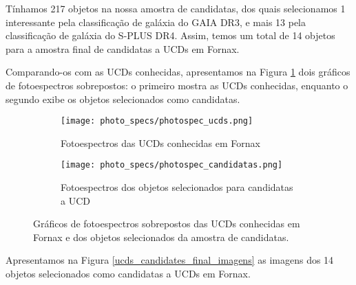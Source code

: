 Tínhamos 217 objetos na nossa amostra de candidatas, dos quais selecionamos 1 interessante pela classificação de galáxia do GAIA DR3, e mais 13 pela classificação de galáxia do S-PLUS DR4. Assim, temos um total de 14 objetos para a amostra final de candidatas a UCDs em Fornax.

Comparando-os com as UCDs conhecidas, apresentamos na Figura \ref{ucds_and_candiadates_star_cut_photospec} dois gráficos de fotoespectros sobrepostos: o primeiro mostra as UCDs conhecidas, enquanto o segundo exibe os objetos selecionados como candidatas.

\begin{figure}[!ht]
    \centering
    \captionsetup{justification=centering}
    \begin{subfigure}[b]{0.95\textwidth}
        \texttt{[image: photo\_specs/photospec\_ucds.png]}
        \caption{Fotoespectros das UCDs conhecidas em Fornax}
    \end{subfigure}
    \begin{subfigure}[b]{0.95\textwidth}
        \texttt{[image: photo\_specs/photospec\_candidatas.png]}
        \caption{Fotoespectros dos objetos selecionados para candidatas a UCD}
    \end{subfigure}
    \caption{Gráficos de fotoespectros sobrepostos das UCDs conhecidas em Fornax e dos objetos selecionados da amostra de candidatas.}
    \label{ucds_and_candiadates_star_cut_photospec}
\end{figure}


Apresentamos na Figura \ref{ucds_candidates_final_imagens} as imagens dos 14 objetos selecionados como candidatas a UCDs em Fornax.

